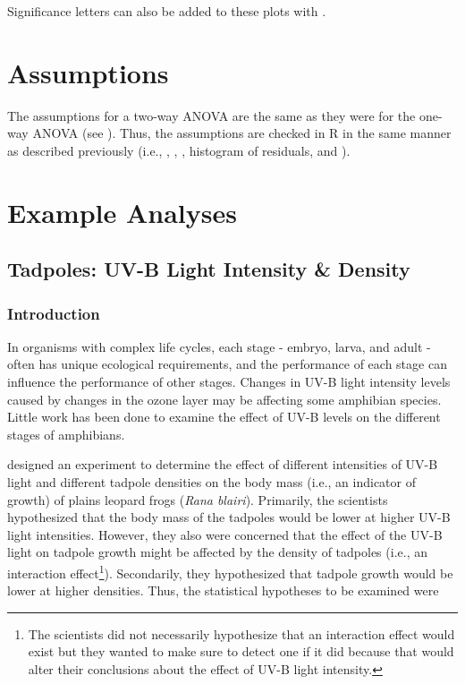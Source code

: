 \documentclass[10pt,openany]{book}\usepackage[]{graphicx}\usepackage[]{color}
\begin{document}
Significance letters can also be added to these plots with .


\section{Assumptions}
The assumptions for a two-way ANOVA are the same as they were for the one-way ANOVA (see ). Thus, the assumptions are checked in R in the same manner as described previously (i.e., , , , histogram of residuals, and ).


\section{Example Analyses} \label{sec:ANOVA2Examples}
\subsection{Tadpoles: UV-B Light Intensity \& Density}
\subsubsection*{Introduction}
In organisms with complex life cycles, each stage - embryo, larva, and adult - often has unique ecological requirements, and the performance of each stage can influence the performance of other stages.  Changes in UV-B light intensity levels caused by changes in the ozone layer may be affecting some amphibian species.  Little work has been done to examine the effect of UV-B levels on the different stages of amphibians.

\cite{Smithetal2000} designed an experiment to determine the effect of different intensities of UV-B light and different tadpole densities on the body mass (i.e., an indicator of growth) of plains leopard frogs (\emph{Rana blairi}).  Primarily, the scientists hypothesized that the body mass of the tadpoles would be lower at higher UV-B light intensities.  However, they also were concerned that the effect of the UV-B light on tadpole growth might be affected by the density of tadpoles (i.e., an interaction effect\footnote{The scientists did not necessarily hypothesize that an interaction effect would exist but they wanted to make sure to detect one if it did because that would alter their conclusions about the effect of UV-B light intensity.}).  Secondarily, they hypothesized that tadpole growth would be lower at higher densities.  Thus, the statistical hypotheses to be examined were
\end{document}
